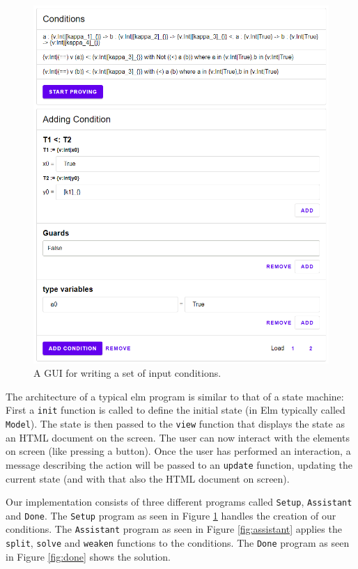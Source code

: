\documentclass[]{scrbook}
\theoremstyle{definition}
\theoremstyle{definition}
\theoremstyle{definition}
\theoremstyle{remark}
\begin{document}
\begin{figure}

{\centering \includegraphics[width=0.75\linewidth]{ui} 

}

\caption{A GUI for writing a set of input conditions.}\label{fig:gui}
\end{figure}

The architecture of a typical elm program is similar to that of a state
machine: First a \texttt{init} function is called to define the initial
state (in Elm typically called \texttt{Model}). The state is then passed
to the \texttt{view} function that displays the state as an HTML
document on the screen. The user can now interact with the elements on
screen (like pressing a button). Once the user has performed an
interaction, a message describing the action will be passed to an
\texttt{update} function, updating the current state (and with that also
the HTML document on screen).

Our implementation consists of three different programs called
\texttt{Setup}, \texttt{Assistant} and \texttt{Done}. The \texttt{Setup}
program as seen in Figure \ref{fig:gui} handles the creation of our
conditions. The \texttt{Assistant} program as seen in Figure
\ref{fig:assistant} applies the \texttt{split}, \texttt{solve} and
\texttt{weaken} functions to the conditions. The \texttt{Done} program
as seen in Figure \ref{fig:done} shows the solution.
\end{document}
